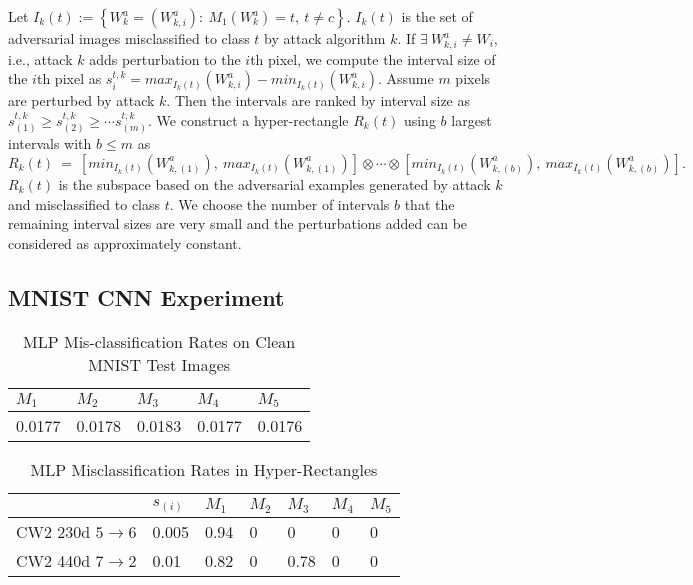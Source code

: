 \documentclass[12pt]{article}
\begin{document}
Let $I_k(t):=\left\{W^a_k=(W^a_{k,i}):~M_1(W^a_k)=t,~
t\neq c \right\}$. $I_k(t)$ is the set of adversarial images 
misclassified to class $t$ by attack algorithm $k$. If $\exists~
W^a_{k,i}\neq W_i$, i.e., attack $k$ adds perturbation to the $i$th
pixel, we compute the interval size of the $i$th pixel as
$s^{t,k}_i = max_{I_k(t)}(W^a_{k,i}) - min_{I_k(t)}(W^a_{k,i})$. Assume $m$
pixels are perturbed by attack $k$. Then the intervals 
are ranked by interval size as $s^{t,k}_{(1)}\geq s^{t,k}_{(2)} \geq \cdots
s^{t,k}_{(m)}$. We construct a hyper-rectangle $R_k(t)$ using $b$ largest
intervals with $b \leq m$ as
%
$$ R_k(t) ~=~ [min_{I_k(t)}(W^a_{k,(1)}),~max_{I_k(t)}(W^a_{k,(1)})] \otimes \cdots  
\otimes [min_{I_k(t)}(W^a_{k,(b)}),~max_{I_k(t)}(W^a_{k,(b)})].$$
%
$R_k(t)$ is the subspace based on the adversarial examples generated by
attack $k$ and misclassified to class $t$. We choose the
number of intervals $b$ that the remaining interval sizes are very
small and the perturbations added can be considered as approximately constant.

%
\subsection{MNIST CNN Experiment}
\label{sec:mnist}

%
\begin{table}[b]
\centering
\caption{MLP Mis-classification Rates on Clean MNIST Test Images}
\label{tab:MLP-baseline}
\begin{center}
  {\footnotesize
\begin{tabular}{|lllll|}
\hline
$M_1$ & $M_2$ & $M_3$ & $M_4$ & $M_5$ \\\hline 
0.0177 & 0.0178 & 0.0183 &  0.0177 &  0.0176 \\
\hline 
\end{tabular} }
\end{center}
\end{table}

%
\begin{table}[b]
\caption{MLP Misclassification Rates in Hyper-Rectangles}
\label{tab:hyper-rec-misrate-MLP}
\begin{center}
{\footnotesize
\begin{tabular}{|l|l|lllll|} \hline
  &$s_{(i)}$ &$M_1$&$M_2$&$M_3$&$M_4$&$M_5$\\\hline
CW2 230d $5\to 6$& 0.005 & 0.94 & 0 & 0 & 0 & 0 \\
CW2 440d $7\to 2$& 0.01 & 0.82 & 0 & 0.78 & 0 & 0 \\
\hline
\end{tabular} }
\end{center}
\end{table}
\end{document}
